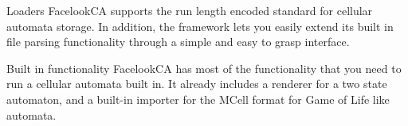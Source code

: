 \documentclass{beamer}
\begin{document}
\begin{frame}{Loaders}
FacelookCA supports the run length encoded standard for cellular automata
storage. In addition, the framework lets you easily extend its built in file
parsing functionality through a simple and easy to grasp interface.
\end{frame}
\begin{frame}{Built in functionality}
FacelookCA has most of the functionality that you need to run a cellular
automata built in. It already includes a renderer for a two state automaton, and
a built-in importer for the MCell format for Game of Life like automata.
\end{frame}
\end{document}

